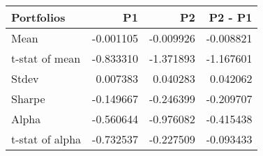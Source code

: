 \begin{tabular}{lrrr}
\toprule
Portfolios & P1 & P2 & P2 - P1 \\
\midrule
Mean & -0.001105 & -0.009926 & -0.008821 \\
t-stat of mean & -0.833310 & -1.371893 & -1.167601 \\
Stdev & 0.007383 & 0.040283 & 0.042062 \\
Sharpe & -0.149667 & -0.246399 & -0.209707 \\
Alpha & -0.560644 & -0.976082 & -0.415438 \\
t-stat of alpha & -0.732537 & -0.227509 & -0.093433 \\
\bottomrule
\end{tabular}
